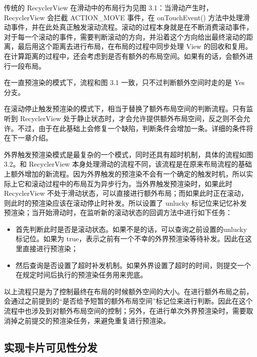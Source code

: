 传统的 RecyclerView 在滑动中的布局行为见图 3.1：当滑动产生时，RecyclerView 会拦截 ACTION\_MOVE 事件，在 onTouchEvent() 方法中处理滑动事件，并在此处真正触发滚动流程。滚动的过程本身就是在不断消费滚动事件，对于每一个滚动的事件，需要判断滚动的方向，并沿着这个方向给出最终滚动的距离，最后用这个距离去进行布局，在布局的过程中同步处理 View 的回收和复用。在计算距离的过程中，还会考虑到是否有额外的布局空间。如果有的话，会额外进行一段布局。



在一直预渲染的模式下，流程和图 3.1 一致，只不过判断额外空间时走的是 Yes 分支。

在滚动停止触发预渲染的模式下，相当于替换了额外布局空间的判断流程。只有监听到 RecyclerView 处于静止状态时，才会允许提供额外布局空间，反之则不会允许。不过，由于在此基础上会修复一个缺陷，判断条件会增加一条。详细的条件将在下一章介绍。

外界触发预渲染模式是最复杂的一个模式，同时还具有超时机制，具体的流程如图 3.2。和 RecyclerView 本身处理滑动的流程不同，该流程是在原来布局流程的基础上额外增加的新流程。因为外界触发的预渲染不会有一个确定的触发时机，所以实际上它和滚动过程中的布局互为异步行为。当外界触发预渲染时，如果此时 RecyclerView 不处于滑动状态，可以直接进行额外布局；而如果此时正在滚动，则此时的预渲染应该在滚动停止时补发。所以设置了 unlucky 标记位来记忆补发预渲染；当开始滑动时，在监听新的滚动状态的回调方法中进行如下任务：



\begin{itemize}
    \item 首先判断此时是否是滚动状态。如果不是的话，可以查询之前设置的unlucky 标记位。如果为 true，表示之前有一个不幸的外界预渲染等待补发。因此在这里直接进行预渲染；
    \item 然后查询是否设置了超时补发机制。如果外界设置了超时的时间，则提交一个在规定时间后执行的预渲染任务用来兜底。
\end{itemize}

以上流程只是为了控制最终在布局的时候额外空间的大小。在进行额外布局之前，会通过之前提到的“是否给予短暂的额外布局空间”标记位来进行判断。因此在这个流程中也涉及到对额外布局空间的控制；另外，在进行单次外界预渲染时，需要取消掉之前提交的预渲染任务，来避免重复进行预渲染。


\subsection{实现卡片可见性分发}

